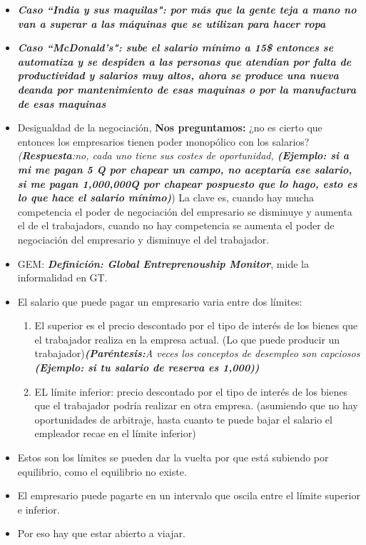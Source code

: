 \begin{itemize}
    \item \textbf{\emph{Caso ``India y sus maquilas": por más que la gente teja a mano no van a superar a las máquinas que se utilizan para hacer ropa}}
    \item \textbf{\emph{Caso ``McDonald's": sube el salario mínimo a 15\$ entonces se automatiza y se despiden a las personas que atendian por falta de productividad y salarios muy altos, ahora se produce una nueva deanda por mantenimiento de esas maquinas o por la manufactura de esas maquinas}}
    \item Desigualdad de la negociación, \textbf{Nos preguntamos:} ¿no es cierto que entonces los empresarios tienen poder monopólico con los salarios? \emph{(\textbf{Respuesta}:no, cada uno tiene sus costes de oportunidad, \textbf{\emph{(Ejemplo: si a mi me pagan 5 Q por chapear un campo, no aceptaría ese salario, si me pagan 1,000,000Q por chapear pospuesto que lo hago, esto es lo que hace el salario mínimo)}}}) La clave es, cuando hay mucha competencia el poder de negociación del empresario se disminuye y aumenta el de el trabajadors, cuando no hay competencia se aumenta el poder de negociación del empresario y disminuye el del trabajador.
    \item GEM: \textbf{\emph{Definición: Global Entreprenouship Monitor}}, mide la informalidad en GT.
    \item El salario que puede pagar un empresario varia entre dos límites:
    \begin{enumerate}
        \item El superior es el precio descontado por el tipo de interés de los bienes que el trabajador realiza en la empresa actual. (Lo que puede producir un trabajador)\emph{\textbf{(Paréntesis:}A veces los conceptos de desempleo son capciosos \textbf{\emph{(Ejemplo: si tu salario de reserva es 1,000)}}\textbf{)}}  
        \item EL límite inferior: precio descontado por el tipo de interés de los bienes que el trabajador podría realizar en otra empresa. (asumiendo que no hay oportunidades de arbitraje, hasta cuanto te puede bajar el salario el empleador recae en el límite inferior)
    \end{enumerate} 
    
    \item Estos son los límites se pueden dar la vuelta por que está subiendo por equilibrio, como el equilibrio no existe.
    \item El empresario puede pagarte en un intervalo que oscila entre el límite superior e inferior.
    \item Por eso hay que estar abierto a viajar.
\end{itemize}

